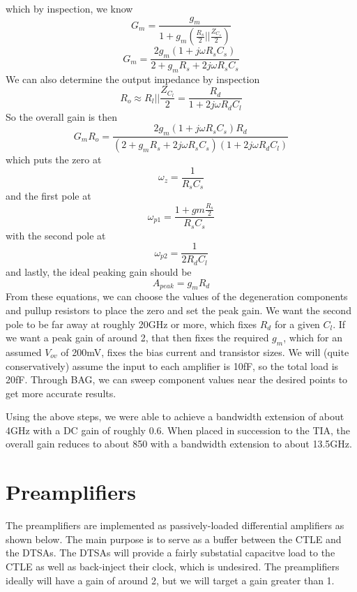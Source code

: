 which by inspection, we know
\begin{equation}
\label{Gm}
G_m=\frac{g_m}{1+g_m(\frac{R_s}{2}||\frac{Z_{C_s}}{2})}
\end{equation}
\begin{equation}
G_m=\frac{2g_m(1+j\omega R_sC_s)}{2+g_mR_s+2j\omega R_sC_s}
\end{equation}
We can also determine the output impedance by inspection
\begin{equation}
\label{Ro}
R_o\approx R_l||\frac{Z_{C_l}}{2}=\frac{R_d}{1+2j\omega R_d C_l}
\end{equation}
So the overall gain is then
\begin{equation}
\label{ctle_gain}
G_mR_o=\frac{2g_m(1+j\omega R_sC_s)R_d}{(2+g_m R_s+2j\omega R_sC_s)(1+2j\omega R_dC_l)}
\end{equation}
which puts the zero at 
\begin{equation}
\label{zero}
\omega_z=\frac{1}{R_sC_s}
\end{equation}
and the first pole at 
\begin{equation}
\label{pole_1}
\omega_{p1}=\frac{1+gm\frac{R_s}{2}}{R_sC_s}
\end{equation}
with the second pole at
\begin{equation}
\label{pole_2}
\omega_{p2}=\frac{1}{2R_dC_l}
\end{equation}
and lastly, the ideal peaking gain should be 
\begin{equation}
\label{peak gain}
A_{peak}=g_mR_d
\end{equation}
From these equations, we can choose the values of the degeneration components and pullup resistors to place the zero and set the peak gain. We want the second pole to be far away at roughly 20GHz or more, which fixes $R_d$ for a given $C_l$. If we want a peak gain of around 2, that then fixes the required $g_m$, which for an assumed $V_{ov}$ of 200mV, fixes the bias current and transistor sizes. We will (quite conservatively) assume the input to each amplifier is 10fF, so the total load is 20fF. Through BAG, we can sweep component values near the desired points to get more accurate results.

Using the above steps, we were able to achieve a bandwidth extension of about 4GHz with a DC gain of roughly 0.6. When placed in succession to the TIA, the overall gain reduces to about 850 with a bandwidth extension to about 13.5GHz.

\section{Preamplifiers}
The preamplifiers are implemented as passively-loaded differential amplifiers as shown below. The main purpose is to serve as a buffer between the CTLE and the DTSAs. The DTSAs will provide a fairly substatial capacitve load to the CTLE as well as back-inject their clock, which is undesired. The preamplifiers ideally will have a gain of around 2, but we will target a gain greater than 1. 

